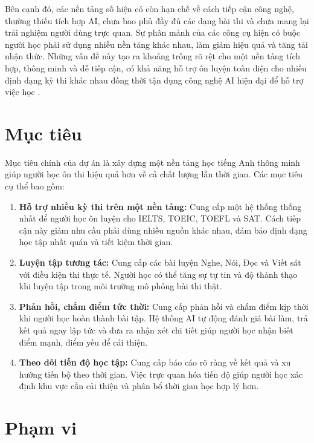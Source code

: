 Bên cạnh đó, các nền tảng số hiện có còn hạn chế về cách tiếp cận công nghệ, thường thiếu tích hợp AI, chưa bao phủ đầy đủ các dạng bài thi và chưa mang lại trải nghiệm người dùng trực quan. Sự phân mảnh của các công cụ hiện có buộc người học phải sử dụng nhiều nền tảng khác nhau, làm giảm hiệu quả và tăng tải nhận thức. Những vấn đề này tạo ra khoảng trống rõ rệt cho một nền tảng tích hợp, thông minh và dễ tiếp cận, có khả năng hỗ trợ ôn luyện toàn diện cho nhiều định dạng kỳ thi khác nhau đồng thời tận dụng công nghệ AI hiện đại để hỗ trợ việc học \cite{ai_education}.

\section{Mục tiêu}

Mục tiêu chính của dự án là xây dựng một nền tảng học tiếng Anh thông minh giúp người học ôn thi hiệu quả hơn về cả chất lượng lẫn thời gian. Các mục tiêu cụ thể bao gồm:

\begin{enumerate}
    \item \textbf{Hỗ trợ nhiều kỳ thi trên một nền tảng:} Cung cấp một hệ thống thống nhất để người học ôn luyện cho IELTS, TOEIC, TOEFL và SAT. Cách tiếp cận này giảm nhu cầu phải dùng nhiều nguồn khác nhau, đảm bảo định dạng học tập nhất quán và tiết kiệm thời gian.
    
    \item \textbf{Luyện tập tương tác:} Cung cấp các bài luyện Nghe, Nói, Đọc và Viết sát với điều kiện thi thực tế. Người học có thể tăng sự tự tin và độ thành thạo khi luyện tập trong môi trường mô phỏng bài thi thật.
    
    \item \textbf{Phản hồi, chấm điểm tức thời:} Cung cấp phản hồi và chấm điểm kịp thời khi người học hoàn thành bài tập. Hệ thống AI tự động đánh giá bài làm, trả kết quả ngay lập tức và đưa ra nhận xét chi tiết giúp người học nhận biết điểm mạnh, điểm yếu để cải thiện.
    
    \item \textbf{Theo dõi tiến độ học tập:} Cung cấp báo cáo rõ ràng về kết quả và xu hướng tiến bộ theo thời gian. Việc trực quan hóa tiến độ giúp người học xác định khu vực cần cải thiện và phân bổ thời gian học hợp lý hơn.
\end{enumerate}


\section{Phạm vi}

